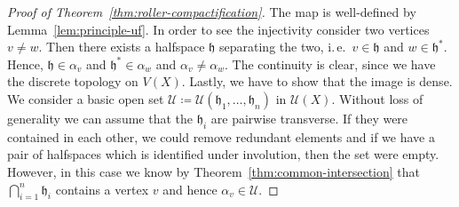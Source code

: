 \begin{proof}[Proof of Theorem~\ref{thm:roller-compactification}]
  The map is well-defined by Lemma~\ref{lem:principle-uf}. In order to see the injectivity consider two vertices \(v \neq w\). Then there exists a halfspace \(\mathfrak{h}\) separating the two, i.\,e.\ \(v \in \mathfrak{h}\) and \(w \in \mathfrak{h}^\ast\). Hence, \(\mathfrak{h} \in \alpha_v\) and \(\mathfrak{h}^\ast \in \alpha_w\) and \(\alpha_v \neq \alpha_w\). The continuity is clear, since we have the discrete topology on \(V(X)\). Lastly, we have to show that the image is dense. We consider a basic open set \(\mathcal{U} \coloneqq \mathcal{U}(\mathfrak{h}_1, \dots, \mathfrak{h}_n)\) in \(\mathcal{U}(X)\). Without loss of generality we can assume that the \(\mathfrak{h}_i\) are pairwise transverse. If they were contained in each other, we could remove redundant elements and if we have a pair of halfspaces which is identified under involution, then the set were empty. However, in this case we know by Theorem~\ref{thm:common-intersection} that \(\bigcap_{i=1}^n \mathfrak{h}_i\) contains a vertex \(v\) and hence \(\alpha_v \in \mathcal{U}\).
\end{proof}

